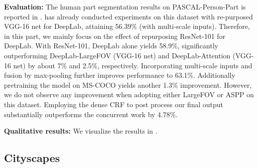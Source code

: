 \textbf{Evaluation:} The human part segmentation results on PASCAL-Person-Part is
reported in . \cite{chen2015attention} has already
conducted experiments on this dataset with re-purposed VGG-16 net for DeepLab,
attaining 56.39\% (with multi-scale inputs). Therefore, in this part, we mainly
focus on the effect of repurposing ResNet-101 for DeepLab. With ResNet-101,
DeepLab alone yields 58.9\%, significantly outperforming DeepLab-LargeFOV
(VGG-16 net) and DeepLab-Attention (VGG-16 net) by about 7\% and 2.5\%,
respectively. Incorporating multi-scale inputs and fusion by max-pooling
further improves performance to 63.1\%. Additionally pretraining the model on
MS-COCO yields another 1.3\% improvement. However, we do not observe any
improvement when adopting either LargeFOV or ASPP on this dataset. Employing
the dense CRF to post process our final output substantially outperforms the
concurrent work \cite{liang2016semantic} by 4.78\%.

\textbf{Qualitative results:} We visualize the results in .

\subsection{Cityscapes}
\label{exp:cityscapes}

